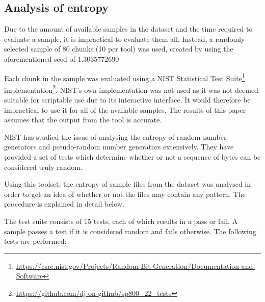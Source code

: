\documentclass[conference]{IEEEtran}
\begin{document}
\subsection{Analysis of entropy}
\label{method:entropy}

Due to the amount of available samples in the dataset and the time required to evaluate a sample, it is impractical to evaluate them all. Instead, a randomly selected sample of 80 chunks (10 per tool) was used, created by using the aforementioned seed of $1.3035772690$

Each chunk in the sample was evaluated using a NIST Statistical Test Suite\footnote{\href{https://csrc.nist.gov/Projects/Random-Bit-Generation/Documentation-and-Software}{https://csrc.nist.gov/Projects/Random-Bit-Generation/Documentation-and-Software}} implementation\footnote{\href{https://github.com/dj-on-github/sp800_22_tests}{https://github.com/dj-on-github/sp800\_22\_tests}}. NIST's own implementation was not used as it was not deemed suitable for scriptable use due to its interactive interface. It would therefore be impractical to use it for all of the available samples. The results of this paper assumes that the output from the tool is accurate.

NIST has studied the issue of analysing the entropy of random number generators and pseudo-random number generators extensively. They have provided a set of tests which determine whether or not a sequence of bytes can be considered truly random\cite{NIST2010}.

Using this toolset, the entropy of sample files from the dataset was analysed in order to get an idea of whether or not the files may contain any pattern. The procedure is explained in detail below.

The test suite consists of 15 tests, each of which results in a pass or fail. A sample passes a test if it is considered random and fails otherwise. The following tests are performed:
\end{document}
